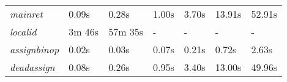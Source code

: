\begin{table}[htbp]
\begin{center}
\begin{tabular}{|l|l|l|l|l|l|l|}
			\rowcolor{light_green_3}
			\textit{mainret} & 0.09s & 0.28s & 1.00s & 3.70s & 13.91s & 52.91s \\
			\rowcolor{light_red_3}
			\textit{localid} & 3m 46s & 57m 35s & - & - & - & - \\
			\rowcolor{light_green_3}
			\textit{assignbinop} & 0.02s & 0.03s & 0.07s & 0.21s & 0.72s & 2.63s \\
			\rowcolor{light_green_3}
			\textit{deadassign} & 0.08s & 0.26s & 0.95s & 3.40s & 13.00s & 49.96s \\

\end{tabular}
\end{center}
\end{table}

